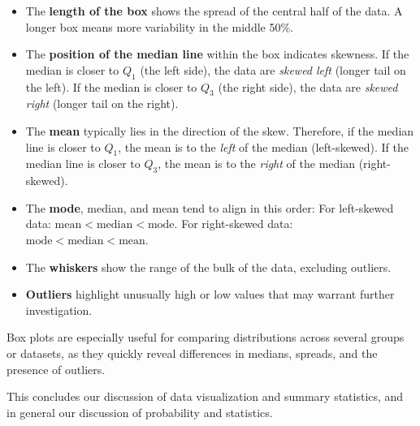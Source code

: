 \begin{itemize}
    \item The \textbf{length of the box} shows the spread of the central half of the data. A longer box means more variability in the middle 50\%.
    \item The \textbf{position of the median line} within the box indicates skewness.  
    If the median is closer to $Q_1$ (the left side), the data are \emph{skewed left} (longer tail on the left).  
    If the median is closer to $Q_3$ (the right side), the data are \emph{skewed right} (longer tail on the right).
    \item The \textbf{mean} typically lies in the direction of the skew.  
    Therefore, if the median line is closer to $Q_1$, the mean is to the \emph{left} of the median (left-skewed).  
    If the median line is closer to $Q_3$, the mean is to the \emph{right} of the median (right-skewed).
    \item The \textbf{mode}, median, and mean tend to align in this order:  
    For left-skewed data: $\text{mean} < \text{median} < \text{mode}$.  
    For right-skewed data: $\text{mode} < \text{median} < \text{mean}$.
    \item The \textbf{whiskers} show the range of the bulk of the data, excluding outliers.
    \item \textbf{Outliers} highlight unusually high or low values that may warrant further investigation.
\end{itemize}

Box plots are especially useful for comparing distributions across several groups or datasets, as they quickly reveal differences in medians, spreads, and the presence of outliers.

This concludes our discussion of data visualization and summary statistics, and in general our discussion of probability and statistics.